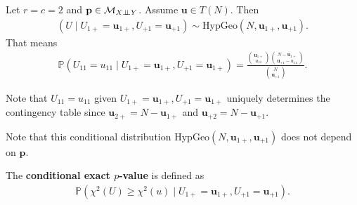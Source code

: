 \begin{mdframed}
\begin{prop}
  Let \( r = c= 2 \) and \( \mathbf{p} \in \mathcal{M}_{X \perp \!\!\! \perp Y} \). Assume \( \mathbf{u} \in T(N) \). Then 
  \begin{align*}
    \left(U \mid U_{1+} = \mathbf{u}_{1+}, U_{+1} = \mathbf{u}_{+1}\right) \sim \mathrm{HypGeo}(N, \mathbf{u}_{1+}, \mathbf{u}_{+1}).
  \end{align*}
  That means 
  \begin{align*}
    \mathbb{P}(U_{11} = u_{11} \mid U_{1+} = \mathbf{u}_{1+}, U_{+1} = \mathbf{u}_{1+}) = \frac{{\mathbf{u}_{1+} \choose u_{11}} {N - \mathbf{u}_{1+} \choose \mathbf u_{+1} - u_{11}}}{{N \choose \mathbf{u}_{+1}}}.
  \end{align*}
\end{prop}
\end{mdframed}

\begin{remark}
  Note that \( U_{11} = u_{11} \) given \( U_{1+} = \mathbf{u}_{1+}, U_{+1} = \mathbf{u}_{1+} \) uniquely determines the contingency table since \( \mathbf{u}_{2+} = N - \mathbf{u}_{1+} \) and \( \mathbf{u}_{+2} = N - \mathbf{u}_{+1} \).
\end{remark}

\begin{remark}
  Note that this conditional distribution \(  \mathrm{HypGeo}(N, \mathbf{u}_{1+}, \mathbf{u}_{+1}) \) does not depend on \( \mathbf{p} \).
\end{remark}

\clearpage
\begin{mdframed}
\begin{defi}
  The \textbf{conditional exact \( p \)-value} is defined as 
  \begin{align*}
    \mathbb{P}(\chi^2(U) \geq\chi^2(u) \mid U_{1+} = \mathbf{u}_{1+}, U_{+1} = \mathbf{u}_{+1}).
  \end{align*}
\end{defi}
\end{mdframed}

